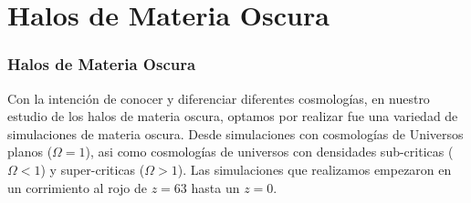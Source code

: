 \documentclass{beamer}
\begin{document}
\section{Halos de Materia Oscura}
\setcounter{equation}{0}
	\begin{frame}
		\frametitle{Halos de Materia Oscura}
		Con la intención de conocer y diferenciar diferentes cosmologías, en nuestro estudio de los halos de materia oscura, optamos por realizar fue una variedad de simulaciones de materia oscura. Desde simulaciones con cosmologías de Universos planos ($\Omega=1$), asi como cosmologías de universos con densidades sub-criticas ($\Omega < 1$) y super-criticas ($\Omega > 1$). Las simulaciones que realizamos empezaron en un corrimiento al rojo de $z = 63$ hasta un $z = 0$.
		
	\end{frame}
\end{document}

